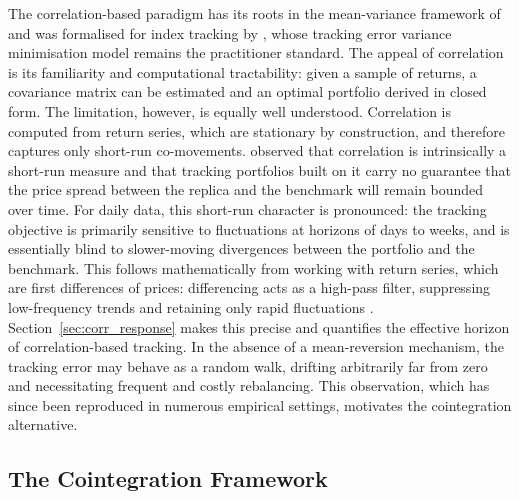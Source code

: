\documentclass[12pt,a4paper]{article}
\begin{document}
The correlation-based paradigm has its roots in the mean-variance
framework of \citet{Markowitz1959} and was formalised for index tracking
by \citet{Roll1992}, whose tracking error variance minimisation model
remains the practitioner standard. The appeal of correlation is its
familiarity and computational tractability: given a sample of returns, a
covariance matrix can be estimated and an optimal portfolio derived in
closed form. The limitation, however, is equally well understood.
Correlation is computed from return series, which are stationary by
construction, and therefore captures only short-run co-movements.
\citet{Alexander1999} observed that correlation is intrinsically a
short-run measure and that tracking portfolios built on it carry no
guarantee that the price spread between the replica and the benchmark
will remain bounded over time. For daily data, this short-run character
is pronounced: the tracking objective is primarily sensitive to
fluctuations at horizons of days to weeks, and is essentially blind to
slower-moving divergences between the portfolio and the benchmark. This
follows mathematically from working with return series, which are first
differences of prices: differencing acts as a high-pass filter,
suppressing low-frequency trends and retaining only rapid fluctuations
\citep{ChaudhuriLo2016,EngleGranger1974}.
Section~\ref{sec:corr_response}
makes this precise and quantifies the effective horizon of
correlation-based tracking. In the absence of a mean-reversion
mechanism, the tracking error may behave as a random walk, drifting
arbitrarily far from zero and necessitating frequent and costly
rebalancing. This observation, which has since been reproduced in
numerous empirical settings, motivates the cointegration alternative.

\subsection{The Cointegration Framework}
\end{document}
